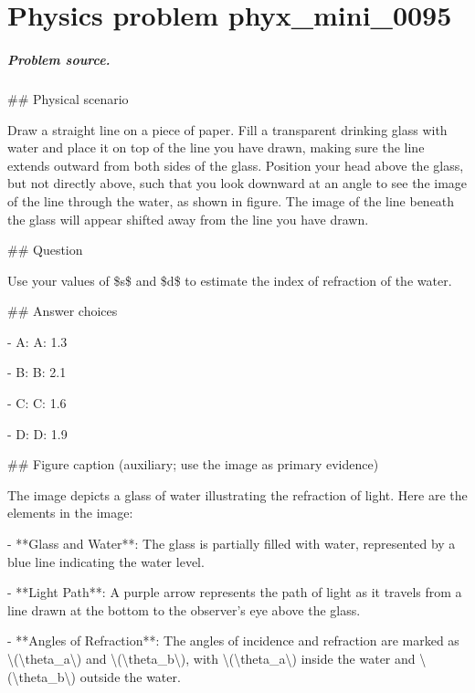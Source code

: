 
\chapter{Physics problem phyx\_mini\_0095}
\label{ch:PhyXMiniProblems_problem_phyx_mini_0095}

\paragraph{Problem source.}
\#\# Physical scenario

Draw a straight line on a piece of paper. Fill a transparent drinking glass with water and place it on top of the line you have drawn, making sure the line extends outward from both sides of the glass. Position your head above the glass, but not directly above, such that you look downward at an angle to see the image of the line through the water, as shown in figure. The image of the line beneath the glass will appear shifted away from the line you have drawn.

\#\# Question

Use your values of \$s\$ and \$d\$ to estimate the index of refraction of the water.

\#\# Answer choices

- A: A: 1.3

- B: B: 2.1

- C: C: 1.6

- D: D: 1.9

\#\# Figure caption (auxiliary; use the image as primary evidence)

The image depicts a glass of water illustrating the refraction of light. Here are the elements in the image:

- **Glass and Water**: The glass is partially filled with water, represented by a blue line indicating the water level.

- **Light Path**: A purple arrow represents the path of light as it travels from a line drawn at the bottom to the observer's eye above the glass.

- **Angles of Refraction**: The angles of incidence and refraction are marked as \textbackslash{}(\textbackslash{}theta\_a\textbackslash{}) and \textbackslash{}(\textbackslash{}theta\_b\textbackslash{}), with \textbackslash{}(\textbackslash{}theta\_a\textbackslash{}) inside the water and \textbackslash{}(\textbackslash{}theta\_b\textbackslash{}) outside the water.

